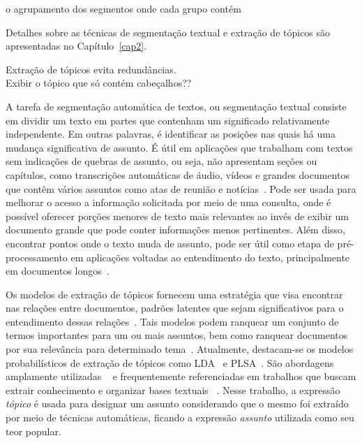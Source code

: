 




o agrupamento dos segmentos onde cada grupo contém 









Detalhes sobre as técnicas de segmentação textual e extração de tópicos são apresentadas no Capítulo~\ref{cap2}.

Extração de tópicos evita redundâncias. \\ Exibir o tópico que só contém cabeçalhos??





A tarefa de segmentação automática de textos, ou segmentação textual consiste em dividir um texto em partes que contenham um significado relativamente independente. Em outras palavras, é identificar as posições nas quais há uma mudança significativa de assunto. É útil em aplicações que trabalham com textos sem indicações de quebras de assunto, ou seja, não apresentam seções ou capítulos, como transcrições automáticas de áudio, vídeos e grandes documentos que contêm vários assuntos como atas de reunião e notícias~\cite{Aggarwal2018, bokaei2015, sakahara2014, misra2009, eisenstein2008, choi2000}.
Pode ser usada para melhorar o acesso a informação solicitada por meio de uma consulta, onde é possível oferecer porções menores de texto mais relevantes ao invés de exibir um documento grande que pode conter informações menos pertinentes.  Além disso, encontrar pontos onde o texto muda de assunto, pode ser útil como etapa de pré-processamento em aplicações voltadas ao entendimento do texto, principalmente em documentos longos~\cite{Choi2000}.




Os modelos de extração de tópicos fornecem uma estratégia que visa encontrar nas relações entre documentos, padrões latentes que sejam significativos para o entendimento dessas relações~\cite{Wei2007}. Tais modelos podem ranquear um conjunto de termos importantes para um ou mais assuntos, bem como ranquear documentos por sua relevância para determinado tema~\cite{Faleiros2016,Xing2009}.
Atualmente, destacam-se os modelos probabilísticos de extração de tópicos como LDA~\cite{Blei2003} e PLSA~\cite{Hofmann1999}. São abordagens amplamente utilizadas ~\cite{DZhu20122} e frequentemente referenciadas em trabalhos que buscam extrair conhecimento e organizar bases textuais ~\cite{Aggarwal2018, OCallaghan2015, Steyvers2007}.  
%
%
Nesse trabalho, a expressão \textit{tópico} é usada para designar um assunto considerando que o mesmo foi extraído por meio de técnicas automáticas, ficando a expressão \textit{assunto} utilizada como seu teor popular. 

